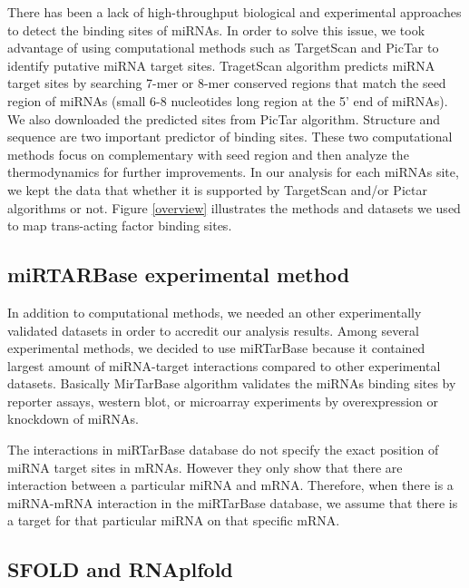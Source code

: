There has been a lack of high-throughput biological and experimental approaches to detect the binding sites of miRNAs. In order to solve this issue, we took advantage of using computational methods such as TargetScan \cite{targetscan_05} and PicTar \cite{pictar_05} to identify putative miRNA target sites. TragetScan algorithm predicts miRNA target sites by searching 7-mer or 8-mer conserved regions that match the seed region of miRNAs (small 6-8 nucleotides long region at the 5' end of miRNAs). We also downloaded the predicted sites from PicTar algorithm. Structure and sequence are two important predictor of binding sites. These two computational methods focus on complementary with seed region and then analyze the thermodynamics for further improvements. In our analysis for each miRNAs site, we kept the data that whether it is supported by TargetScan and/or Pictar algorithms or not. Figure \ref{overview} illustrates the methods and datasets we used to map trans-acting factor binding sites.

\subsection{miRTARBase experimental method}

In addition to computational methods, we needed an other experimentally validated datasets in order to accredit our analysis results. Among several experimental methods, we decided to use miRTarBase \cite{mirtarbase} because it contained largest amount of miRNA-target interactions compared to other experimental datasets. Basically MirTarBase algorithm validates the miRNAs binding sites by reporter assays, western blot, or microarray experiments by overexpression or knockdown of miRNAs.

The interactions in miRTarBase database do not specify the exact position of miRNA target sites in mRNAs. However they only show that there are interaction between a particular miRNA and mRNA. Therefore, when there is a miRNA-mRNA interaction in the miRTarBase database, we assume that there is a target for that particular miRNA on that specific mRNA.


\subsection{SFOLD and RNAplfold}

